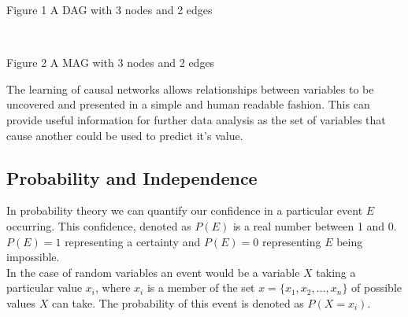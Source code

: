 \documentclass{article}
\begin{document}
\begin{center}
\end{center}

\begin{center}
Figure 1 A DAG with 3 nodes and 2 edges
\end{center}

\begin{center}
\\
\end{center}

\begin{center}
Figure 2 A MAG with 3 nodes and 2 edges
\end{center}


The learning of causal networks allows relationships between variables to be uncovered and presented in a simple and human readable fashion. This can provide useful information for further data analysis as the set of variables that cause another could be used to predict it's value.
\\

\subsection{Probability and Independence}
In probability theory we can quantify our confidence in a particular event $ E $ occurring. This confidence, denoted as $ P(E) $ is a real number between 1 and 0. $  P(E) = 1 $ representing a certainty and $  P(E) = 0 $ representing $E$ being impossible.
\\

In the case of random variables an event would be a variable $X$ taking a particular value $x_i$, where $x_i$ is a member of the set $x = \{x_1, x_2, ..., x_n\}$ of possible values $X$ can take. The probability of this event is denoted as $P(X=x_i)$.
\\
\end{document}
